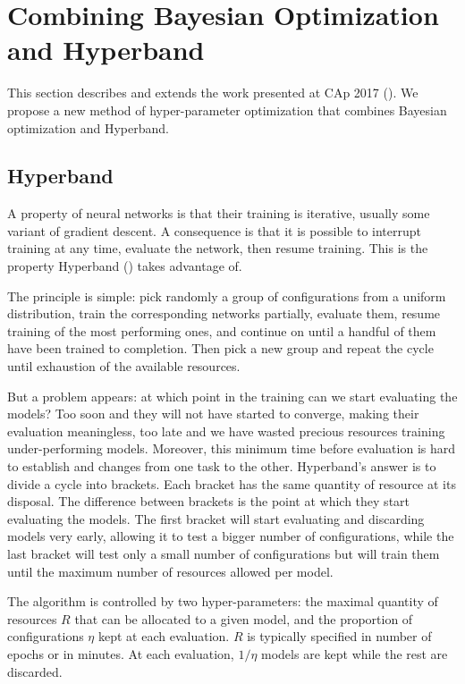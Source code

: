 \section{Combining Bayesian Optimization and Hyperband}
\label{sec:cap}

This section describes and extends the work presented at CAp 2017 (\textcite{bertrand2017CAp}). We propose a new method of hyper-parameter optimization that combines Bayesian optimization and Hyperband.

\subsection{Hyperband}
\label{ssec:hyperband}

A property of neural networks is that their training is iterative, usually some variant of gradient descent. A consequence is that it is possible to interrupt training at any time, evaluate the network, then resume training. This is the property Hyperband (\textcite{li2017ICLR}) takes advantage of.

The principle is simple: pick randomly a group of configurations from a uniform distribution, train the corresponding networks partially, evaluate them, resume training of the most performing ones, and continue on until a handful of them have been trained to completion. Then pick a new group and repeat the cycle until exhaustion of the available resources.

But a problem appears: at which point in the training can we start evaluating the models? Too soon and they will not have started to converge, making their evaluation meaningless, too late and we have wasted precious resources training under-performing models. Moreover, this minimum time before evaluation is hard to establish and changes from one task to the other. Hyperband's answer is to divide a cycle into brackets. Each bracket has the same quantity of resource at its disposal. The difference between brackets is the point at which they start evaluating the models. The first bracket will start evaluating and discarding models very early, allowing it to test a bigger number of configurations, while the last bracket will test only a small number of configurations but will train them until the maximum number of resources allowed per model.

The algorithm is controlled by two hyper-parameters: the maximal quantity of resources $R$ that can be allocated to a given model, and the proportion of configurations $\eta$ kept at each evaluation. $R$ is typically specified in number of epochs or in minutes. At each evaluation, $1 / \eta$ models are kept while the rest are discarded. 

